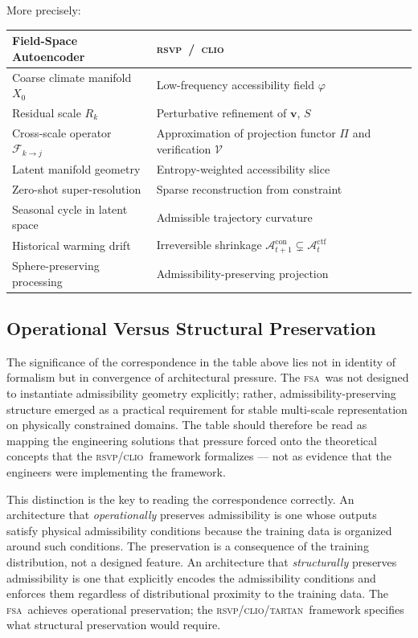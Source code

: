 \documentclass[11pt,a4paper]{article}
\theoremstyle{plain}
\theoremstyle{definition}
\theoremstyle{remark}
\newcommand{\A}{\mathcal{A}}
\newcommand{\RSVP}{\textup{\textsc{rsvp}}}
\newcommand{\CLIO}{\textup{\textsc{clio}}}
\newcommand{\TARTAN}{\textup{\textsc{tartan}}}
\newcommand{\FSA}{\textup{\textsc{fsa}}}
\begin{document}
More precisely:

\begin{center}
\begin{tabular}{@{}>{\raggedright}p{5.0cm}>{\raggedright\arraybackslash}p{6.0cm}@{}}
\toprule
\textbf{Field-Space Autoencoder} & \textbf{\RSVP\ /\ \CLIO} \\
\midrule
Coarse climate manifold $X_0$ & Low-frequency accessibility field $\varphi$\\[0.3em]
Residual scale $R_k$ & Perturbative refinement of $\mathbf{v}$, $S$\\[0.3em]
Cross-scale operator $\mathcal{F}_{k\to j}$ & Approximation of projection functor $\Pi$ and verification $\mathcal{V}$\\[0.3em]
Latent manifold geometry & Entropy-weighted accessibility slice\\[0.3em]
Zero-shot super-resolution & Sparse reconstruction from constraint\\[0.3em]
Seasonal cycle in latent space & Admissible trajectory curvature\\[0.3em]
Historical warming drift & Irreversible shrinkage $\A_{t+1}^{\mathrm{con}}\subsetneq\A_t^{\mathrm{ctf}}$\\[0.3em]
Sphere-preserving processing & Admissibility-preserving projection\\
\bottomrule
\end{tabular}
\end{center}

\subsection{Operational Versus Structural Preservation}

The significance of the correspondence in the table above lies not in
identity of formalism but in convergence of architectural pressure. The
\FSA\ was not designed to instantiate admissibility geometry explicitly;
rather, admissibility-preserving structure emerged as a practical
requirement for stable multi-scale representation on physically constrained
domains. The table should therefore be read as mapping the engineering
solutions that pressure forced onto the theoretical concepts that the
\RSVP/\CLIO\ framework formalizes --- not as evidence that the engineers
were implementing the framework.

This distinction is the key to reading the correspondence correctly. An
architecture that \textit{operationally} preserves admissibility is one
whose outputs satisfy physical admissibility conditions because the training
data is organized around such conditions. The preservation is a consequence
of the training distribution, not a designed feature. An architecture that
\textit{structurally} preserves admissibility is one that explicitly encodes
the admissibility conditions and enforces them regardless of distributional
proximity to the training data. The \FSA\ achieves operational preservation;
the \RSVP/\CLIO/\TARTAN\ framework specifies what structural preservation
would require.
\end{document}
